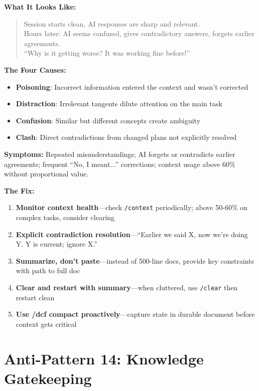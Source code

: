 \textbf{What It Looks Like:}

\begin{quote}
Session starts clean, AI responses are sharp and relevant.\\
Hours later: AI seems confused, gives contradictory answers, forgets earlier agreements.\\
``Why is it getting worse? It was working fine before!''
\end{quote}

\textbf{The Four Causes:}
\begin{itemize}
    \item \textbf{Poisoning}: Incorrect information entered the context and wasn't corrected
    \item \textbf{Distraction}: Irrelevant tangents dilute attention on the main task
    \item \textbf{Confusion}: Similar but different concepts create ambiguity
    \item \textbf{Clash}: Direct contradictions from changed plans not explicitly resolved
\end{itemize}

\textbf{Symptoms:} Repeated misunderstandings; AI forgets or contradicts earlier agreements; frequent ``No, I meant...'' corrections; context usage above 60\% without proportional value.

\textbf{The Fix:}
\begin{enumerate}
    \item \textbf{Monitor context health}---check \texttt{/context} periodically; above 50-60\% on complex tasks, consider clearing
    \item \textbf{Explicit contradiction resolution}---``Earlier we said X, now we're doing Y. Y is current; ignore X.''
    \item \textbf{Summarize, don't paste}---instead of 500-line docs, provide key constraints with path to full doc
    \item \textbf{Clear and restart with summary}---when cluttered, use \texttt{/clear} then restart clean
    \item \textbf{Use /dcf compact proactively}---capture state in durable document before context gets critical
\end{enumerate}

\section{Anti-Pattern 14: Knowledge Gatekeeping}

